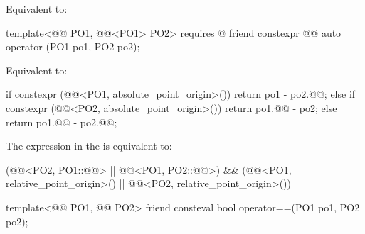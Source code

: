 \begin{itemdescr}
\pnum
\effects
Equivalent to:
\end{itemdescr}

\begin{itemdecl}
template<@@ PO1, @@<PO1{}> PO2>
  requires @\seebelownc@
friend constexpr @@ auto operator-(PO1 po1, PO2 po2);
\end{itemdecl}

\begin{itemdescr}
\pnum
\effects
Equivalent to:
\begin{codeblock}
if constexpr (@@<PO1, absolute_point_origin>()) {
  return po1 - po2.@@;
} else if constexpr (@@<PO2, absolute_point_origin>()) {
  return po1.@@ - po2;
} else {
  return po1.@@ - po2.@@;
}
\end{codeblock}

\pnum
\remarks
The expression in the  is equivalent to:
\begin{codeblock}
(@@<PO2, PO1::@@> ||
 @@<PO1, PO2::@@>) &&
  (@@<PO1, relative_point_origin>() ||
   @@<PO2, relative_point_origin>())
\end{codeblock}
\end{itemdescr}

\begin{itemdecl}
template<@@ PO1, @@ PO2>
friend consteval bool operator==(PO1 po1, PO2 po2);
\end{itemdecl}

